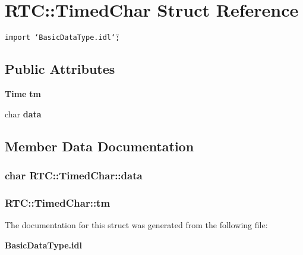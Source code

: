 \section{RTC::Timed\-Char Struct Reference}
\label{structRTC_1_1TimedChar}
{\tt import \char`\"{}Basic\-Data\-Type.idl\char`\"{};}

\subsection*{Public Attributes}
\begin{CompactItemize}
\item 
{\bf Time} {\bf tm}
\item 
char {\bf data}
\end{CompactItemize}


\subsection{Member Data Documentation}
\subsubsection{\setlength{\rightskip}{0pt plus 5cm}char {\bf RTC::Timed\-Char::data}}\label{structRTC_1_1TimedChar_RTC_1_1TimedCharo1}


\subsubsection{ {\bf RTC::Timed\-Char::tm}}\label{structRTC_1_1TimedChar_RTC_1_1TimedCharo0}




The documentation for this struct was generated from the following file:\begin{CompactItemize}
\item 
{\bf Basic\-Data\-Type.idl}\end{CompactItemize}
